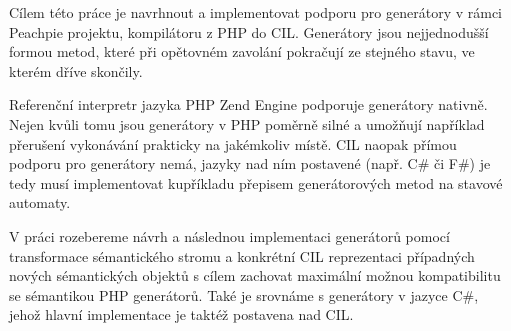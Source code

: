 \documentclass[12pt,a4paper]{report}
\begin{document}
Cílem této práce je navrhnout a implementovat podporu pro generátory v rámci Peachpie projektu, kompilátoru z PHP do CIL. Generátory jsou nejjednodušší formou metod, které při opětovném zavolání pokračují ze stejného stavu, ve kterém dříve skončily. 

Referenční interpretr jazyka PHP Zend Engine podporuje generátory nativně. Nejen kvůli tomu jsou generátory v PHP poměrně silné a umožňují například přerušení vykonávání prakticky na jakémkoliv místě. CIL naopak přímou podporu pro generátory nemá, jazyky nad ním postavené (např. C\# či F\#) je tedy musí implementovat kupříkladu přepisem generátorových metod na stavové automaty. 

V práci rozebereme návrh a následnou implementaci generátorů pomocí transformace sémantického stromu a konkrétní CIL reprezentaci případných nových sémantických objektů s cílem zachovat maximální možnou kompatibilitu se sémantikou PHP generátorů. Také je srovnáme s generátory v jazyce C\#, jehož hlavní implementace je taktéž postavena nad CIL.
\end{document}

